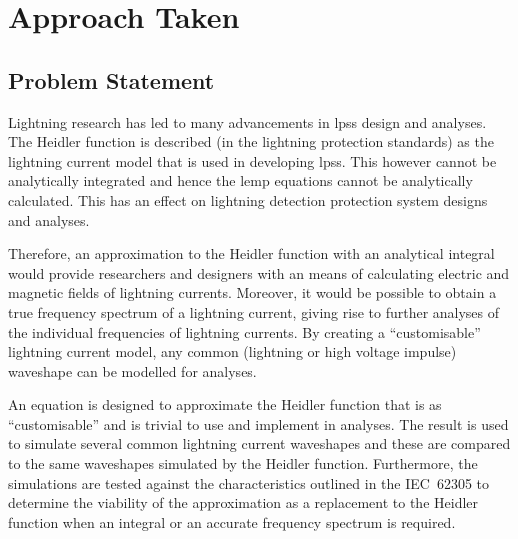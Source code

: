 
\chapter{Approach Taken} %

\label{ChapterApproach} %

\begin{quote}
\end{quote}


\section{Problem Statement}
\label{sec:problem_statement}
Lightning research has led to many advancements in \glspl{lps} design and analyses. The Heidler function is described (in the lightning protection standards) as the lightning current model that is used in developing \glspl{lps}. This however cannot be analytically integrated and hence the \gls{lemp} equations cannot be analytically calculated. This has an effect on lightning detection protection system designs and analyses.

Therefore, an approximation to the Heidler function with an analytical integral would provide researchers and designers with an means of calculating electric and magnetic fields of lightning currents. Moreover, it would be possible to obtain a true frequency spectrum of a lightning current, giving rise to further analyses of the individual frequencies of lightning currents. By creating a ``customisable'' lightning current model, any common (lightning or high voltage impulse) waveshape can be modelled for analyses.

An equation is designed to approximate the Heidler function that is as ``customisable'' and is trivial to use and implement in analyses. The result is used to simulate several common lightning current waveshapes and these are compared to the same waveshapes simulated by the Heidler function. Furthermore, the simulations are tested against the characteristics outlined in the IEC~62305 to determine the viability of the approximation as a replacement to the Heidler function when an integral or an accurate frequency spectrum is required.

